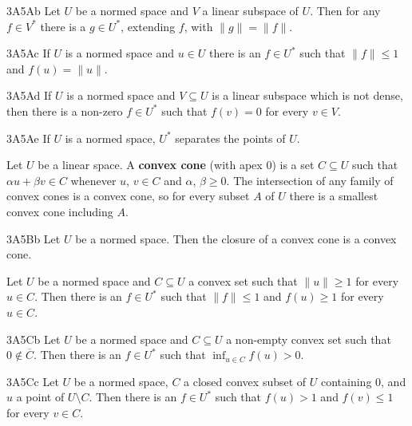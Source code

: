 \spheader 3A5Ab
Let $U$ be a normed space and $V$ a linear subspace of $U$.   Then for
any $f\in V^*$ there is a $g\in U^*$, extending $f$, with $\|g\|=\|f\|$.

\spheader 3A5Ac If $U$ is a normed space and $u\in U$ there is an
$f\in U^*$ such that $\|f\|\le 1$ and $f(u)=\|u\|$.

\spheader 3A5Ad If $U$ is a normed space and $V\subseteq U$ is a linear
subspace which is not dense, then there is a non-zero $f\in U^*$ such
that $f(v)=0$ for every $v\in V$.

\spheader 3A5Ae If $U$ is a normed space, $U^*$ separates the points of
$U$.

Let $U$ be a linear space.  A {\bf convex cone} (with
apex $0$) is a set $C\subseteq U$ such that $\alpha u+\beta v\in C$
whenever $u$, $v\in C$ and $\alpha$, $\beta\ge 0$.   The intersection of
any family of convex cones is a convex cone, so for every subset $A$ of
$U$ there is a smallest convex cone including $A$.

\spheader 3A5Bb Let $U$ be a normed space.   Then the closure of a
convex cone is a convex cone.

 Let $U$ be a
normed space and $C\subseteq U$ a convex set such that $\|u\|\ge 1$ for
every $u\in C$.   Then there is an $f\in U^*$ such that $\|f\|\le 1$ and
$f(u)\ge 1$ for every $u\in C$.   

\spheader 3A5Cb Let $U$ be a normed space and $C\subseteq U$ a non-empty
convex set such
that $0\notin\overline{C}$.   Then there is an $f\in U^*$ such that
$\inf_{u\in C}f(u)>0$.

\spheader 3A5Cc Let $U$ be a normed space, $C$ a closed convex subset of
$U$ containing $0$, and $u$ a point of $U\setminus C$.   Then there is
an $f\in U^*$ such that $f(u)>1$ and $f(v)\le 1$ for every $v\in C$.

